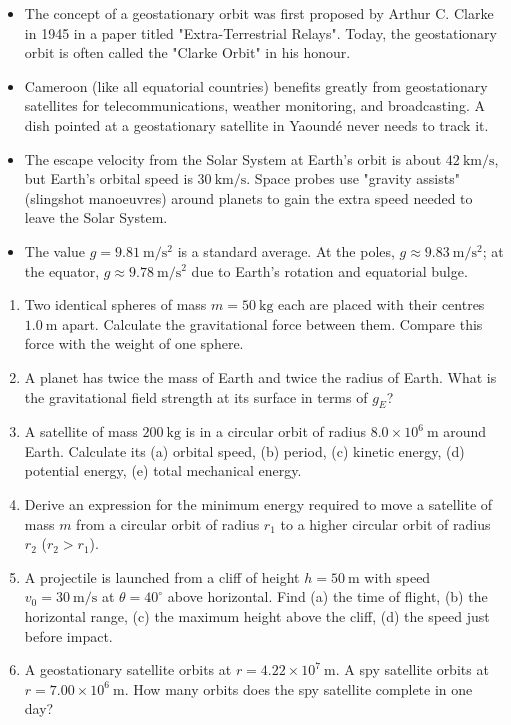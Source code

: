 \documentclass[11pt]{article}
\begin{document}
\begin{savaistu}
\begin{itemize}
\item The concept of a geostationary orbit was first proposed by Arthur C. Clarke in 1945 in a paper titled "Extra-Terrestrial Relays". Today, the geostationary orbit is often called the "Clarke Orbit" in his honour.
\item Cameroon (like all equatorial countries) benefits greatly from geostationary satellites for telecommunications, weather monitoring, and broadcasting. A dish pointed at a geostationary satellite in Yaoundé never needs to track it.
\item The escape velocity from the Solar System at Earth's orbit is about $42\ \mathrm{km/s}$, but Earth's orbital speed is $30\ \mathrm{km/s}$. Space probes use "gravity assists" (slingshot manoeuvres) around planets to gain the extra speed needed to leave the Solar System.
\item The value $g = 9.81\ \mathrm{m/s^2}$ is a standard average. At the poles, $g \approx 9.83\ \mathrm{m/s^2}$; at the equator, $g \approx 9.78\ \mathrm{m/s^2}$ due to Earth's rotation and equatorial bulge.
\end{itemize}
\end{savaistu}

\begin{exercice}
\begin{enumerate}
\item Two identical spheres of mass $m = 50\ \mathrm{kg}$ each are placed with their centres $1.0\ \mathrm{m}$ apart. Calculate the gravitational force between them. Compare this force with the weight of one sphere.
\item A planet has twice the mass of Earth and twice the radius of Earth. What is the gravitational field strength at its surface in terms of $g_E$?
\item A satellite of mass $200\ \mathrm{kg}$ is in a circular orbit of radius $8.0\times 10^{6}\ \mathrm{m}$ around Earth. Calculate its (a) orbital speed, (b) period, (c) kinetic energy, (d) potential energy, (e) total mechanical energy.
\item Derive an expression for the minimum energy required to move a satellite of mass $m$ from a circular orbit of radius $r_1$ to a higher circular orbit of radius $r_2$ ($r_2 > r_1$).
\item A projectile is launched from a cliff of height $h = 50\ \mathrm{m}$ with speed $v_0 = 30\ \mathrm{m/s}$ at $\theta = 40^\circ$ above horizontal. Find (a) the time of flight, (b) the horizontal range, (c) the maximum height above the cliff, (d) the speed just before impact.
\item A geostationary satellite orbits at $r = 4.22\times 10^{7}\ \mathrm{m}$. A spy satellite orbits at $r = 7.00\times 10^{6}\ \mathrm{m}$. How many orbits does the spy satellite complete in one day?
\end{enumerate}
\end{exercice}
\end{document}
